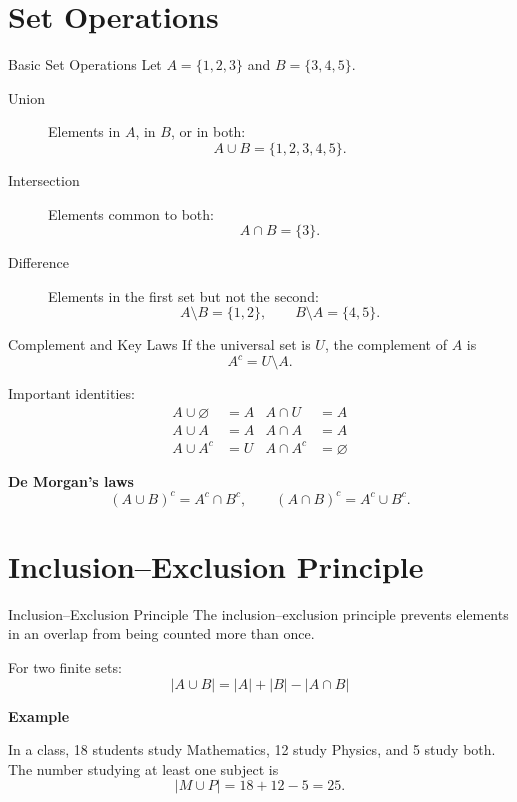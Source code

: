 \documentclass[aspectratio=169,11pt]{beamer}
\begin{document}
\section{Set Operations}

\begin{frame}{Basic Set Operations}
Let \(A=\{1,2,3\}\) and \(B=\{3,4,5\}\).

\begin{description}
  \item[Union] Elements in \(A\), in \(B\), or in both:
  \[
    A\cup B=\{1,2,3,4,5\}.
  \]
  \item[Intersection] Elements common to both:
  \[
    A\cap B=\{3\}.
  \]
  \item[Difference] Elements in the first set but not the second:
  \[
    A\setminus B=\{1,2\},\qquad B\setminus A=\{4,5\}.
  \]
\end{description}
\end{frame}

\begin{frame}{Complement and Key Laws}
If the universal set is \(U\), the complement of \(A\) is
\[
  A^c=U\setminus A.
\]

Important identities:
\begin{align*}
 A\cup\varnothing&=A & A\cap U&=A\\
 A\cup A&=A & A\cap A&=A\\
 A\cup A^c&=U & A\cap A^c&=\varnothing
\end{align*}

\textbf{De Morgan's laws}
\[
 (A\cup B)^c=A^c\cap B^c,\qquad
 (A\cap B)^c=A^c\cup B^c.
\]
\end{frame}

\section{Inclusion--Exclusion Principle}

\begin{frame}{Inclusion--Exclusion Principle}
The inclusion--exclusion principle prevents elements in an overlap from
being counted more than once.

For two finite sets:
\[
  \boxed{|A\cup B|=|A|+|B|-|A\cap B|}
\]

\textbf{Example}

In a class, 18 students study Mathematics, 12 study Physics, and 5 study
both. The number studying at least one subject is
\[
  |M\cup P|=18+12-5=\boxed{25}.
\]
\end{frame}
\end{document}
